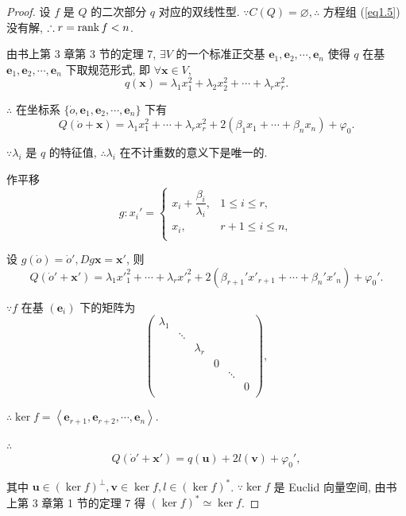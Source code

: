 \documentclass[color=black,device=normal,lang=cn,mode=geye]{elegantnote}
\begin{document}
\begin{proof}
    设 $f$ 是 $Q$ 的二次部分 $q$ 对应的双线性型. $\because C(Q)=\varnothing,\therefore$ 方程组 (\ref{eq1.5}) 没有解, $\therefore r=\operatorname{rank} f<n$.

    由书上第 3 章第 3 节的定理 7, $\exists V$ 的一个标准正交基 $\boldsymbol{e}_1,\boldsymbol{e}_2,\cdots,\boldsymbol{e}_n$ 使得 $q$ 在基 $\boldsymbol{e}_1,\boldsymbol{e}_2,\cdots,\boldsymbol{e}_n$ 下取规范形式, 即 $\forall\boldsymbol{x}\in V$,
    \[q(\boldsymbol{x})=\lambda_1x^2_1+\lambda_2x^2_2+\cdots+\lambda_rx^2_r.\]

    $\therefore$ 在坐标系 $\{\dot{o},\boldsymbol{e}_1,\boldsymbol{e}_2,\cdots,\boldsymbol{e}_n\}$ 下有
    \[Q(\dot{o}+\boldsymbol{x})=\lambda_1x^2_1+\cdots+\lambda_rx^2_r+2(\beta_1x_1+\cdots+\beta_nx_n)+\varphi_0.\]

    $\because\lambda_i$ 是 $q$ 的特征值, $\therefore\lambda_i$ 在不计重数的意义下是唯一的.

    作平移
    \[g:x_i'=\begin{cases}
        x_i+\dfrac{\beta_i}{\lambda_i}, & 1\leq i\leq r, \\
        x_i, & r+1\leq i\leq n, \\
    \end{cases}\]

    设 $g(\dot{o})=\dot{o}',Dg\boldsymbol{x}=\boldsymbol{x}'$, 则
    \[Q(\dot{o}'+\boldsymbol{x}')=\lambda_1x'^2_1+\cdots+\lambda_rx'^2_r+2(\beta_{r+1}'x'_{r+1}+\cdots+\beta_n'x'_n)+\varphi_0'.\]

    $\because f$ 在基 $(\boldsymbol{e}_i)$ 下的矩阵为
    \[\begin{pmatrix}
        \lambda_1 \\
        & \ddots \\
        && \lambda_r \\
        &&& 0 \\
        &&&& \ddots \\
        &&&&& 0 \\
    \end{pmatrix},\]

    $\therefore\ker f=\left<\boldsymbol{e}_{r+1},\boldsymbol{e}_{r+2},\cdots,\boldsymbol{e}_n\right>$.

    $\therefore$
    \[Q(\dot{o}'+\boldsymbol{x}')=q(\boldsymbol{u})+2l(\boldsymbol{v})+\varphi_0',\]

    其中 $\boldsymbol{u}\in(\ker f)^\perp,\boldsymbol{v}\in\ker f,l\in(\ker f)^*$. $\because\ker f$ 是 Euclid 向量空间, 由书上第 3 章第 1 节的定理 7 得 $(\ker f)^*\simeq\ker f$.
    

\end{proof}
\end{document}
